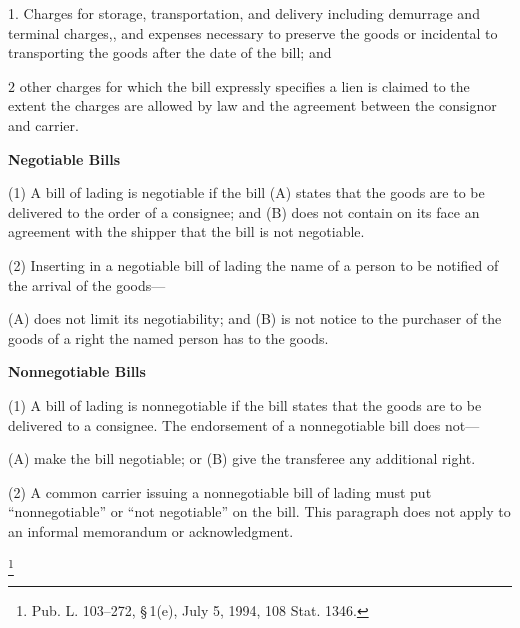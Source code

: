 1. Charges for storage, transportation, and delivery including demurrage and terminal charges,, and expenses necessary to preserve the goods or incidental to transporting the goods after the date of the bill; and

\(2\) other charges for which the bill expressly specifies a lien is claimed to the extent the charges are allowed by law and the agreement between the consignor and carrier.

\textbf{ Negotiable Bills}

(1) A bill of lading is negotiable if the bill
  (A) states that the goods are to be delivered to the order of a consignee; and
  (B) does not contain on its face an agreement with the shipper that the bill is not negotiable.

(2) Inserting in a negotiable bill of lading the name of a person to be notified of the arrival of the goods—

  (A) does not limit its negotiability; and
  (B) is not notice to the purchaser of the goods of a right the named person has to the goods.

 \textbf{Nonnegotiable Bills}

  (1) A bill of lading is nonnegotiable if the bill states that the goods are to be delivered to a consignee. The endorsement of a nonnegotiable bill does not—

    (A) make the bill negotiable; or
    (B) give the transferee any additional right.

  (2) A common carrier issuing a nonnegotiable bill of lading must put “nonnegotiable” or “not negotiable” on the bill. This paragraph does not apply to an informal memorandum or acknowledgment.

\footnote{Pub. L. 103–272, § 1(e), July 5, 1994, 108 Stat. 1346.}